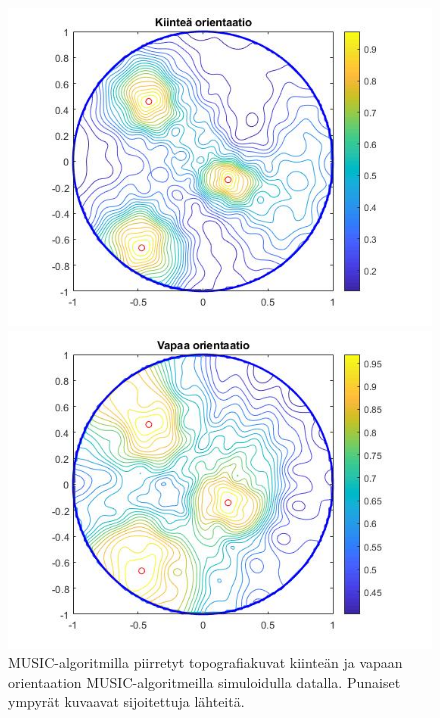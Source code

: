 \begin{figure}[hb]
    \begin{minipage}{0.5\textwidth}
        \centering
        \includegraphics[width=\textwidth]{mfix.jpg} 
    \end{minipage}
    \begin{minipage}{0.5\textwidth}
        \centering
        \includegraphics[width=\textwidth]{mfree.jpg}
    \end{minipage}
    \caption{MUSIC-algoritmilla piirretyt topografiakuvat kiinteän ja vapaan orientaation MUSIC-algoritmeilla simuloidulla datalla. Punaiset ympyrät kuvaavat sijoitettuja lähteitä.}
    \label{fig:music}
\end{figure}

